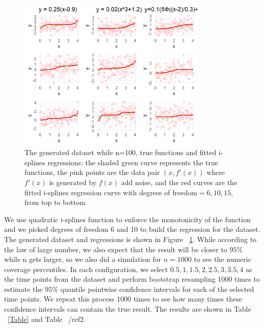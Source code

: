 \documentclass[12pt]{article}
\begin{document}
\begin{figure}[H]
  \centering
  \includegraphics[width=0.8\textwidth]{DataPointsGeneration.png}
  \caption{The generated dataset while n=100, true functions and fitted i-splines regressions: the shaded green curve represents the true functions, the pink points are the data pair \((x, f'(x))\) where \(f'(x)\) is generated by \(f(x)\) add noise, and the red curves are the fitted i-splines regression curve with degrees of freedom\(= 6,10,15\), from top to bottom}
  \label{fig:DataAndRegressions}
\end{figure}

We use quadratic i-splines function to enforce the monotonicity of the function and we picked degrees of freedom 6 and 10 to build the regression for the dataset. The generated dataset and regressions is shown in Figure ~\ref{fig:DataAndRegressions}. While according to the law of large number, we also expect that the result will be closer to \(95\%\) while n gets larger, so we also did a simulation for \(n = 1000\) to see the numeric coverage percentiles. In each configuration, we select \(0.5,1,1.5,2,2.5,3,3.5,4\) as the time points from the dataset and perform bootstrap resampling 1000 times to estimate the \(95\%\) quantile pointwise confidence intervals for each of the selected time points. We repeat this process 1000 times to see how many times these confidence intervals can contain the true result. The results are shown in Table ~\ref{Table} and Table ~/ref{2}. 
\end{document}
